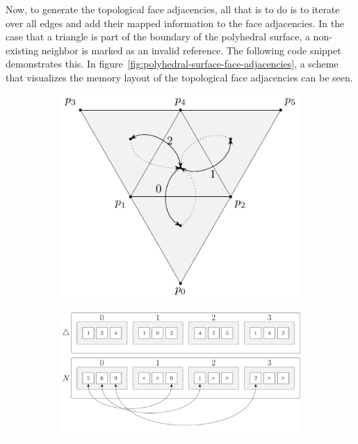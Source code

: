 \documentclass{stdlocal}
\begin{document}
  Now, to generate the topological face adjacencies, all that is to do is to iterate over all edges and add their mapped information to the face adjacencies.
  In the case that a triangle is part of the boundary of the polyhedral surface, a non-existing neighbor is marked as an invalid reference.
  The following code snippet demonstrates this.
  In figure~\ref{fig:polyhedral-surface-face-adjacencies}, a scheme that visualizes the memory layout of the topological face adjacencies can be seen.

  \begin{figure}
    \centering
    \begin{subfigure}[c]{0.38\linewidth}
      \centering
      \includegraphics[width=\linewidth]{figures/polyhedral-surface-triangle-adjacencies.pdf}
    \end{subfigure}
    \hfill
    \begin{subfigure}[c]{0.60\linewidth}
      \centering
      \includegraphics[width=\linewidth]{figures/polyhedral-surface-triangle-adjacencies-struct.pdf}

\end{subfigure}
\end{figure}
\end{document}
